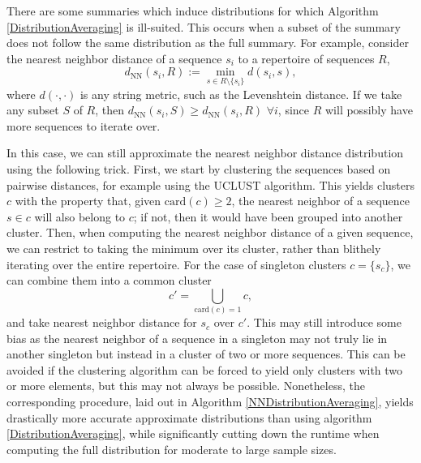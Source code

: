 \documentclass{article}
\begin{document}
There are some summaries which induce distributions for which Algorithm \ref{DistributionAveraging} is ill-suited.
This occurs when a subset of the summary does not follow the same distribution as the full summary.
For example, consider the nearest neighbor distance of a sequence $s_i$ to a repertoire of sequences $R$,
\begin{equation}
d_\text{NN}(s_i, R) := \min_{s \in R \setminus \{s_i\}} d(s_i, s),
\end{equation}
where $d(\cdot, \cdot)$ is any string metric, such as the Levenshtein distance.
If we take any subset $S$ of $R$, then $d_\text{NN}(s_i, S) \ge d_\text{NN}(s_i, R)$ $\forall i$, since $R$ will possibly have more sequences to iterate over.

In this case, we can still approximate the nearest neighbor distance distribution using the following trick.
First, we start by clustering the sequences based on pairwise distances, for example using the UCLUST algorithm.
This yields clusters $c$ with the property that, given $\text{card}(c) \ge 2$, the nearest neighbor of a sequence $s \in c$ will also belong to $c$; if not, then it would have been grouped into another cluster.
Then, when computing the nearest neighbor distance of a given sequence, we can restrict to taking the minimum over its cluster, rather than blithely iterating over the entire repertoire. 
For the case of singleton clusters $c = \{s_c\}$, we can combine them into a common cluster
\begin{equation}
\label{singleton_union}
c' = \bigcup_{\text{card}(c) = 1} c,
\end{equation}
and take nearest neighbor distance for $s_c$ over $c'$.
This may still introduce some bias as the nearest neighbor of a sequence in a singleton may not truly lie in another singleton but instead in a cluster of two or more sequences.
This can be avoided if the clustering algorithm can be forced to yield only clusters with two or more elements, but this may not always be possible.
Nonetheless, the corresponding procedure, laid out in Algorithm \ref{NNDistributionAveraging}, yields drastically more accurate approximate distributions than using algorithm \ref{DistributionAveraging}, while significantly cutting down the runtime when computing the full distribution for moderate to large sample sizes.
\end{document}
